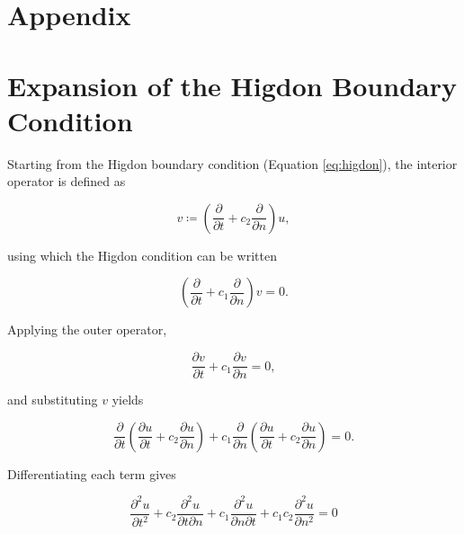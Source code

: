 \documentclass[final-report]{report-template}
\begin{document}
\newpage

 

\newpage
\appendix
{}
{}
\section*{Appendix}

\section{Expansion of the Higdon Boundary Condition}
\label{app:hig_exp}

Starting from the Higdon boundary condition (Equation \eqref{eq:higdon}), the interior operator is defined as

\begin{equation}
    v \coloneqq \left( \frac{\partial}{\partial t} + c_2 \frac{\partial}{\partial n} \right)u,
\end{equation}

using which the Higdon condition can be written

\begin{equation}
    \left( \frac{\partial}{\partial t} + c_1 \frac{\partial}{\partial n} \right)v = 0.
\end{equation}

Applying the outer operator,

\begin{equation}
    \frac{\partial v}{\partial t} + c_1 \frac{\partial v}{\partial n} = 0,
\end{equation}

and substituting $v$ yields

\begin{equation}
    \frac{\partial}{\partial t} \left( \frac{\partial u}{\partial t} + c_2 \frac{\partial u}{\partial n} \right) +
    c_1 \frac{\partial}{\partial n} \left( \frac{\partial u}{\partial t} + c_2 \frac{\partial u}{\partial n} \right) = 0.
\end{equation}

Differentiating each term gives

\begin{equation}
    \frac{\partial^2 u}{\partial t^2} + 
    c_2 \frac{\partial^2 u}{\partial t \partial n } + 
    c_1\frac{\partial^2 u}{\partial n \partial t} +
    c_1 c_2 \frac{\partial^2 u}{\partial n^2} = 0
\end{equation}
\end{document}
